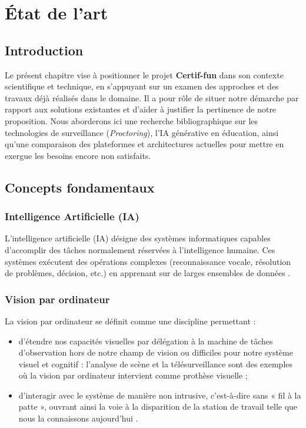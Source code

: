 \chapter{État de l'art}

\section{Introduction}
Le présent chapitre vise à positionner le projet \textbf{Certif-fun} dans son contexte scientifique et technique, en s'appuyant sur un examen des approches et des travaux déjà réalisés dans le domaine. Il a pour rôle de situer notre démarche par rapport aux solutions existantes et d'aider à justifier la pertinence de notre proposition. Nous aborderons ici une recherche bibliographique sur les technologies de surveillance (\textit{Proctoring}), l'IA générative en éducation, ainsi qu'une comparaison des plateformes et architectures actuelles pour mettre en exergue les besoins encore non satisfaits.

\section{Concepts fondamentaux}
\subsection{Intelligence Artificielle (IA)}
L’intelligence artificielle (IA) désigne des systèmes informatiques capables d’accomplir des tâches normalement réservées à l’intelligence humaine. Ces systèmes exécutent des opérations complexes (reconnaissance vocale, résolution de problèmes, décision, etc.) en apprenant sur de larges ensembles de données \cite{benani2024histoire}.

\subsection{Vision par ordinateur}
La vision par ordinateur se définit comme une discipline permettant :
\begin{itemize}
    \item d’étendre nos capacités visuelles par délégation à la machine de tâches d’observation hors de notre champ de vision ou difficiles pour notre système visuel et cognitif : l’analyse de scène et la télésurveillance sont des exemples où la vision par ordinateur intervient comme prothèse visuelle ;
    \item d’interagir avec le système de manière non intrusive, c’est-à-dire sans « fil à la patte », ouvrant ainsi la voie à la disparition de la station de travail telle que nous la connaissons aujourd’hui \cite{berard2004vision}.
\end{itemize}

